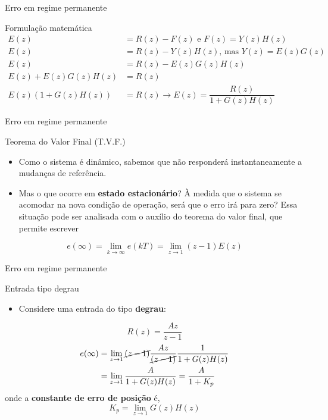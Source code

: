 \begin{frame}{Erro em regime permanente}
	\centering
	
	\scalebox{0.8}{}
	
\begin{block}{Formulação matemática}
	\begin{align*}
		E(z)&=R(z)-F(z) \text{ e } F(z)=Y(z)H(z)\\
		E(z)&=R(z)-Y(z)H(z) \text{, mas }Y(z)=E(z)G(z)\\
		E(z)&=R(z)-E(z)G(z)H(z)\\
		E(z)+E(z)G(z)H(z)&=R(z)\\
		E(z)(1+G(z)H(z))&=R(z)\rightarrow \boxed{E(z)=\dfrac{R(z)}{1+G(z)H(z)}}
	\end{align*}
\end{block}
\end{frame}


\begin{frame}{Erro em regime permanente}
\begin{block}{Teorema do Valor Final (T.V.F.)}
\begin{itemize}
    \item Como o sistema é dinâmico, sabemos que não responderá instantaneamente a mudanças de referência.
    \item Mas o que ocorre em \textbf{estado estacionário}? À medida que o sistema se acomodar na nova condição de operação, será que o erro irá para zero? Essa situação pode ser analisada com o auxílio do teorema do valor final, que permite  escrever 
\end{itemize}
	\[ e(\infty)=\lim\limits_{k\to\infty}e(kT)=\lim\limits_{z\to1}(z-1)E(z) \]
\end{block}
\end{frame}


\begin{frame}{Erro em regime permanente}
\begin{block}{Entrada tipo degrau}
\begin{itemize}
    \item Considere uma entrada do tipo \textbf{degrau}:
\end{itemize}
$$R(z)=\dfrac{Az}{z-1}$$
	\begin{align*}
		e(\infty)&=\lim\limits_{z\to1}\cancel{(z-1)}\frac{Az}{\cancel{(z-1)}}\frac{1}{1+G(z)H(z)} \\
		&=\lim\limits_{z\to1}\frac{A}{1+G(z)H(z)}=\frac{A}{1+K_p}
	\end{align*}
	onde a \textbf{constante de erro de posição} é,
	\[ \boxed{K_p=\lim\limits_{z\to1} G(z)H(z)} \]
\end{block}
\end{frame}


